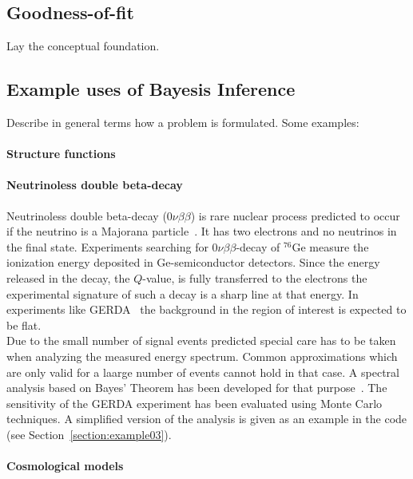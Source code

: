 \documentclass[11pt, a4paper]{article}
\begin{document}
\subsection{Goodness-of-fit} 

Lay the conceptual foundation. 

\subsection{Example uses of Bayesis Inference} 
\label{subsection:exampleuses} 

Describe in general terms how a problem is formulated. Some examples:

\paragraph{Structure functions} 

\paragraph{Neutrinoless double beta-decay} 

Neutrinoless double beta-decay ($0\nu\beta\beta$) is rare nuclear
process predicted to occur if the neutrino is a Majorana
particle~\cite{Yao:2006px}. It has two electrons and no neutrinos in
the final state. Experiments searching for $0\nu\beta\beta$-decay of
$^{76}$Ge measure the ionization energy deposited in Ge-semiconductor
detectors. Since the energy released in the decay, the $Q$-value, is
fully transferred to the electrons the experimental signature of such
a decay is a sharp line at that energy. In experiments like
GERDA~\cite{Schonert:2005zn} the background in the region of interest
is expected to be flat. \\ 

\noindent 
Due to the small number of signal events predicted special care has to
be taken when analyzing the measured energy spectrum. Common
approximations which are only valid for a laarge number of events
cannot hold in that case. A spectral analysis based on Bayes' Theorem
has been developed for that purpose~\cite{Caldwell:2006yj}. The
sensitivity of the GERDA experiment has been evaluated using Monte
Carlo techniques. A simplified version of the analysis is given as an
example in the code (see Section~\ref{section:example03}). 

\paragraph{Cosmological models} 
\end{document}
